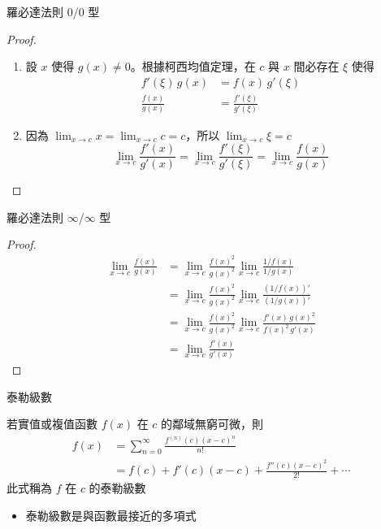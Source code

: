 \documentclass{beamer}
\begin{document}
\begin{CJK}{UTF8}{bsmi}
\begin{frame}{羅必達法則 0/0 型}
  \begin{proof}
    \begin{enumerate}
      \item 設 $x$ 使得 $g(x)\ne 0$。根據柯西均值定理，在 $c$ 與 $x$ 間必存在 $\xi$ 使得
	\begin{align*}
	  f'(\xi)\,g(x) &= f(x)\,g'(\xi)\\
	  \frac{f(x)}{g(x)} &= \frac{f'(\xi)}{g'(\xi)}
	\end{align*}
      \item 因為 $\displaystyle \lim_{x \to c} x = \lim_{x \to c} c = c$，所以 $\displaystyle \lim_{x \to c} \xi = c$
	\[\lim_{x \to c} \frac{f'(x)}{g'(x)} = \lim_{x \to c} \frac{f'(\xi)}{g'(\xi)} = \lim_{x \to c} \frac{f(x)}{g(x)}\]
    \end{enumerate}
  \end{proof}
\end{frame}

\begin{frame}{羅必達法則 $\infty$/$\infty$ 型}
  \begin{proof}
    \begin{align*}
      \lim_{x \to c} \frac{f(x)}{g(x)} &= \lim_{x \to c} \frac{f(x)^2}{g(x)^2} \lim_{x \to c} \frac{1/f(x)}{1/g(x)}\\
	&= \lim_{x \to c} \frac{f(x)^2}{g(x)^2} \lim_{x \to c} \frac{(1/f(x))'}{(1/g(x))'}\\
	&= \lim_{x \to c} \frac{f(x)^2}{g(x)^2} \lim_{x \to c} \frac{f'(x)\,g(x)^2}{f(x)^2\,g'(x)}\\
	&= \lim_{x \to c} \frac{f'(x)}{g'(x)}
    \end{align*}
  \end{proof}
\end{frame}

\begin{frame}{泰勒級數}
  \begin{definition}
    若實值或複值函數 $f(x)$ 在 $c$ 的鄰域無窮可微，則
    \begin{align*}
      f(x) &= \sum_{n=0}^{\infty} \frac{f^{(n)}(c) \left( x - c \right)^n}{n!}\\
	&= f(c) + f'(c) \left( x - c \right) + \frac{f''(c) \left( x - c \right)^2}{2!} + \cdots
    \end{align*}
    此式稱為 $f$ 在 $c$ 的泰勒級數
  \end{definition}
  \begin{itemize}
    \item 泰勒級數是與函數最接近的多項式
  \end{itemize}
\end{frame}


\end{CJK}
\end{document}

